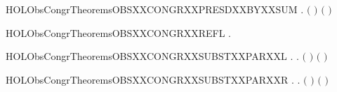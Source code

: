 \newcommand{\HOLObsCongrTheoremsOBSXXCONGRXXPRESDXXBYXXPAR}{\UseVerbatim{HOLObsCongrTheoremsOBSXXCONGRXXPRESDXXBYXXPAR}}
\begin{SaveVerbatim}{HOLObsCongrTheoremsOBSXXCONGRXXPRESDXXBYXXSUM}
\HOLTokenTurnstile{} \HOLSymConst{\HOLTokenForall{}}   .
          \HOLSymConst{\HOLTokenConj{}}    \HOLSymConst{\HOLTokenImp{}}
        \ensuremath{(} \HOLSymConst{\ensuremath{+}} \ensuremath{)} \ensuremath{(} \HOLSymConst{\ensuremath{+}} \ensuremath{)}
\end{SaveVerbatim}
\newcommand{\HOLObsCongrTheoremsOBSXXCONGRXXPRESDXXBYXXSUM}{\UseVerbatim{HOLObsCongrTheoremsOBSXXCONGRXXPRESDXXBYXXSUM}}
\begin{SaveVerbatim}{HOLObsCongrTheoremsOBSXXCONGRXXREFL}
\HOLTokenTurnstile{} \HOLSymConst{\HOLTokenForall{}}.   
\end{SaveVerbatim}
\newcommand{\HOLObsCongrTheoremsOBSXXCONGRXXREFL}{\UseVerbatim{HOLObsCongrTheoremsOBSXXCONGRXXREFL}}
\begin{SaveVerbatim}{HOLObsCongrTheoremsOBSXXCONGRXXSUBSTXXPARXXL}
\HOLTokenTurnstile{} \HOLSymConst{\HOLTokenForall{}} .    \HOLSymConst{\HOLTokenImp{}} \HOLSymConst{\HOLTokenForall{}}.  \ensuremath{(} \HOLSymConst{\ensuremath{\mid}} \ensuremath{)} \ensuremath{(} \HOLSymConst{\ensuremath{\mid}} \ensuremath{)}
\end{SaveVerbatim}
\newcommand{\HOLObsCongrTheoremsOBSXXCONGRXXSUBSTXXPARXXL}{\UseVerbatim{HOLObsCongrTheoremsOBSXXCONGRXXSUBSTXXPARXXL}}
\begin{SaveVerbatim}{HOLObsCongrTheoremsOBSXXCONGRXXSUBSTXXPARXXR}
\HOLTokenTurnstile{} \HOLSymConst{\HOLTokenForall{}} .    \HOLSymConst{\HOLTokenImp{}} \HOLSymConst{\HOLTokenForall{}}.  \ensuremath{(} \HOLSymConst{\ensuremath{\mid}} \ensuremath{)} \ensuremath{(} \HOLSymConst{\ensuremath{\mid}} \ensuremath{)}
\end{SaveVerbatim}
